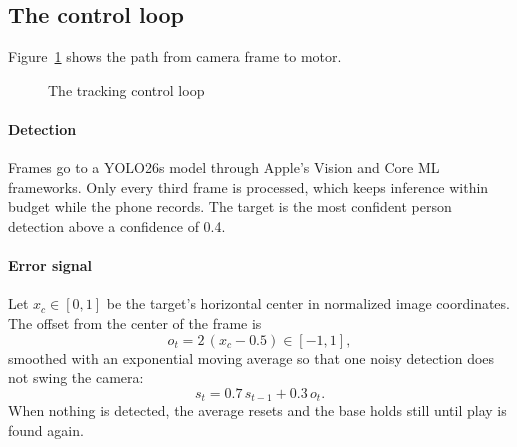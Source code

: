 \documentclass[letterpaper,11pt]{article}
\begin{document}
\subsection{The control loop}

Figure~\ref{f:loop} shows the path from camera frame to motor.

\begin{figure}[H]
\caption{The tracking control loop}\label{f:loop}
\end{figure}

\paragraph{Detection} Frames go to a YOLO26s model \citep{Ultralytics} through Apple's Vision and
Core ML frameworks. Only every third frame is processed, which keeps inference within budget while
the phone records. The target is the most confident person detection above a confidence of 0.4.

\paragraph{Error signal} Let $x_c \in [0,1]$ be the target's horizontal center in normalized
image coordinates. The offset from the center of the frame is
\begin{equation}
o_t = 2\,(x_c - 0.5) \in [-1, 1],
\label{e:offset}\end{equation}
smoothed with an exponential moving average so that one noisy detection does not swing the camera:
\begin{equation}
s_t = 0.7\,s_{t-1} + 0.3\,o_t.
\label{e:ema}\end{equation}
When nothing is detected, the average resets and the base holds still until play is found again.
\end{document}
